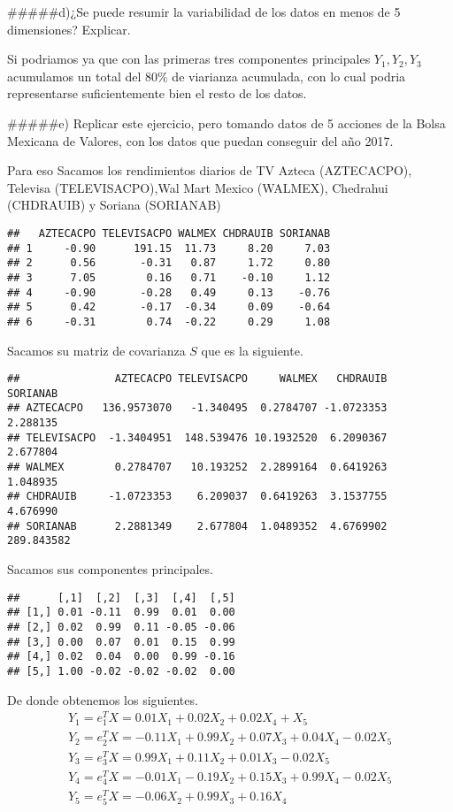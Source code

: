 \documentclass[]{article}
\begin{document}
\#\#\#\#\#d)¿Se puede resumir la variabilidad de los datos en menos de 5
dimensiones? Explicar.

Si podriamos ya que con las primeras tres componentes principales
\(Y_{1},Y_{2},Y_{3}\) acumulamos un total del \(80\%\) de viarianza
acumulada, con lo cual podria representarse suficientemente bien el
resto de los datos.

\#\#\#\#\#e) Replicar este ejercicio, pero tomando datos de 5 acciones
de la Bolsa Mexicana de Valores, con los datos que puedan conseguir del
año 2017.

Para eso Sacamos los rendimientos diarios de TV Azteca (AZTECACPO),
Televisa (TELEVISACPO),Wal Mart Mexico (WALMEX), Chedrahui (CHDRAUIB) y
Soriana (SORIANAB)

\begin{verbatim}
##   AZTECACPO TELEVISACPO WALMEX CHDRAUIB SORIANAB
## 1     -0.90      191.15  11.73     8.20     7.03
## 2      0.56       -0.31   0.87     1.72     0.80
## 3      7.05        0.16   0.71    -0.10     1.12
## 4     -0.90       -0.28   0.49     0.13    -0.76
## 5      0.42       -0.17  -0.34     0.09    -0.64
## 6     -0.31        0.74  -0.22     0.29     1.08
\end{verbatim}

Sacamos su matriz de covarianza \(S\) que es la siguiente.

\begin{verbatim}
##               AZTECACPO TELEVISACPO     WALMEX   CHDRAUIB   SORIANAB
## AZTECACPO   136.9573070   -1.340495  0.2784707 -1.0723353   2.288135
## TELEVISACPO  -1.3404951  148.539476 10.1932520  6.2090367   2.677804
## WALMEX        0.2784707   10.193252  2.2899164  0.6419263   1.048935
## CHDRAUIB     -1.0723353    6.209037  0.6419263  3.1537755   4.676990
## SORIANAB      2.2881349    2.677804  1.0489352  4.6769902 289.843582
\end{verbatim}

Sacamos sus componentes principales.

\begin{verbatim}
##      [,1]  [,2]  [,3]  [,4]  [,5]
## [1,] 0.01 -0.11  0.99  0.01  0.00
## [2,] 0.02  0.99  0.11 -0.05 -0.06
## [3,] 0.00  0.07  0.01  0.15  0.99
## [4,] 0.02  0.04  0.00  0.99 -0.16
## [5,] 1.00 -0.02 -0.02 -0.02  0.00
\end{verbatim}

De donde obtenemos los siguientes. \[\begin{array}{l}
Y_{1} = e_{1}^TX =  0.01X_{1} + 0.02X_{2} + 0.02X_{4} + X_{5}\\
Y_{2} = e_{2}^TX = -0.11X_{1} + 0.99X_{2} + 0.07X_{3} + 0.04X_{4} - 0.02X_{5}\\
Y_{3} = e_{3}^TX =  0.99X_{1} + 0.11X_{2} + 0.01X_{3} - 0.02X_{5}\\
Y_{4} = e_{4}^TX = -0.01X_{1} - 0.19X_{2} + 0.15X_{3} + 0.99X_{4} - 0.02X_{5}\\
Y_{5} = e_{5}^TX = - 0.06X_{2} + 0.99X_{3} + 0.16X_{4}\\
\end{array}\]
\end{document}

